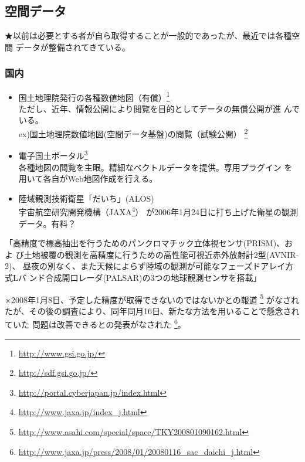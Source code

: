 \documentclass[mingoth,a4paper]{jsarticle}
\begin{document}
\subsection{空間データ}

★以前は必要とする者が自ら取得することが一般的であったが、最近では各種空間
データが整備されてきている。

\subsubsection{国内}
\begin{itemize}
 \item 国土地理院発行の各種数値地図（有償）\footnote{\url{http://www.gsi.go.jp/}}\\
       ただし、近年、情報公開により閲覧を目的としてデータの無償公開が進
       んでいる。\\
       ex)国土地理院数値地図(空間データ基盤)の閲覧（試験公開）
       \footnote{\url{http://sdf.gsi.go.jp/}}
 \item 電子国土ポータル\footnote{\url{http://portal.cyberjapan.jp/index.html}}\\
       各種地図の閲覧を主眼。精細なベクトルデータを提供。専用プラグイン
       を用いて各自がWeb地図作成を行える。
 \item 陸域観測技術衛星「だいち」(ALOS)\\
       宇宙航空研究開発機構（JAXA\footnote{\url{http://www.jaxa.jp/index_j.html}}）
       が2006年1月24日に打ち上げた衛星の観測データ。有料？
\end{itemize}

「高精度で標高抽出を行うためのパンクロマチック立体視センサ(PRISM)、およ
び土地被覆の観測を高精度に行うための高性能可視近赤外放射計2型(AVNIR-2)、
昼夜の別なく、また天候によらず陸域の観測が可能なフェーズドアレイ方式Lバ
ンド合成開口レーダ(PALSAR)の3つの地球観測センサを搭載」

※2008年1月8日、予定した精度が取得できないのではないかとの報道
\footnote{\url{http://www.asahi.com/special/space/TKY200801090162.html}}
がなされたが、その後の調査により、同年同月16日、新たな方法を用いることで懸念されていた
問題は改善できるとの発表がなされた
\footnote{\url{http://www.jaxa.jp/press/2008/01/20080116_sac_daichi_j.html}}。
\end{document}
